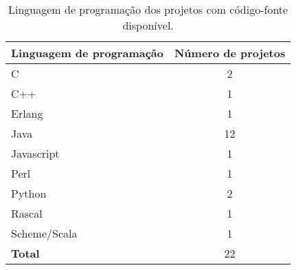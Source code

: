 \begin{table}[h]
\caption{Linguagem de programação dos projetos com código-fonte disponível.}
\centering
\begin{tabular}{ l c }
  \hline
  {\bf Linguagem de programação} & {\bf Número de projetos} \\
  \hline
  C & 2 \\
  C++ & 1 \\
  Erlang & 1 \\
  Java & 12 \\
  Javascript & 1 \\
  Perl & 1 \\
  Python & 2 \\
  Rascal & 1 \\
  Scheme/Scala & 1 \\
  \hline
  {\bf Total} & 22 \\
  \hline
\end{tabular}
\label{programming-language-table}
\end{table}

